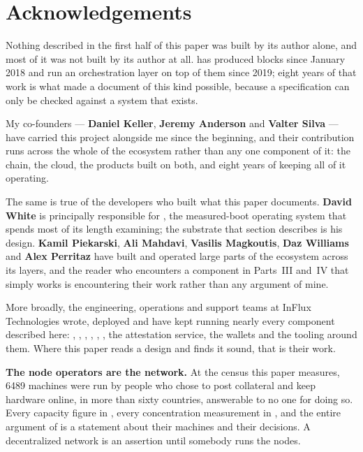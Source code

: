 \section*{Acknowledgements}
\label{sec:acknowledgements}

Nothing described in the first half of this paper was built by its author alone, and most of it was
not built by its author at all. \Flux{} has produced blocks since January 2018 and run an
orchestration layer on top of them since 2019; eight years of that work is what made a document of
this kind possible, because a specification can only be checked against a system that exists.

My co-founders --- \textbf{Daniel Keller}, \textbf{Jeremy Anderson} and \textbf{Valter Silva} ---
have carried this project alongside me since the beginning, and their contribution runs across the
whole of the \Flux{} ecosystem rather than any one component of it: the chain, the cloud, the
products built on both, and eight years of keeping all of it operating.

The same is true of the developers who built what this paper documents. \textbf{David White} is
principally responsible for \ArcaneOS, the measured-boot operating system that
 spends most of its length examining; the substrate that section
describes is his design. \textbf{Kamil Piekarski}, \textbf{Ali Mahdavi}, \textbf{Vasilis
Magkoutis}, \textbf{Daz Williams} and \textbf{Alex Perritaz} have built and operated large parts of
the ecosystem across its layers, and the reader who encounters a component in Parts~III and~IV that
simply works is encountering their work rather than any argument of mine.

More broadly, the engineering, operations and support teams at InFlux Technologies wrote, deployed
and have kept running nearly every component described here: \fluxd, \FluxOS, \fluxbench, \ArcaneOS,
\FDM, \PDNS, the attestation service, the wallets and the tooling around them. Where this paper reads
a design and finds it sound, that is their work.

\textbf{The node operators are the network.} At the census this paper measures, \num{6489} machines
were run by people who chose to post collateral and keep hardware online, in more than sixty
countries, answerable to no one for doing so. Every capacity figure in ,
every concentration measurement in , and the entire argument of
 is a statement about their machines and their decisions. A decentralized network is
an assertion until somebody runs the nodes.

